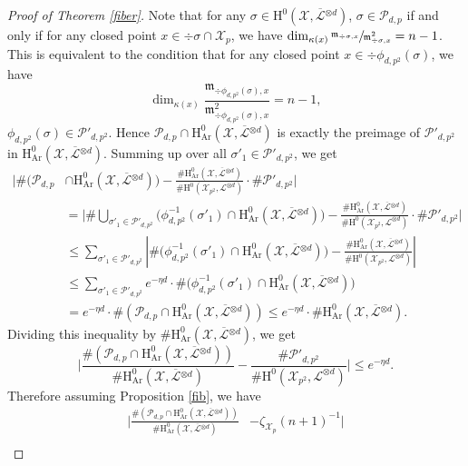 \documentclass[JEP,XML,SOM,Unicode,published]{cedram}
\theoremstyle{plain}
\theoremstyle{definition}
\newcommand{\ho}{\mathrm{H}}
\newcommand{\m}{\mathfrak{m}}
\newcommand{\X}{\mathcal{X}}
\newcommand{\Li}{\overline{\mathcal{L}}{}}
\newcommand{\li}{\mathcal{L}}
\begin{document}
\begin{proof}[Proof of Theorem \ref{fiber}]
Note that for any $\sigma\in \ho^0(\X, \Li^{\otimes d})$, $\sigma \in \mathcal{P}_{d,p}$ if and only if for any closed point $x\in \div \sigma\cap \X_p$, we have $\dim_{\kappa(x)}\sfrac{\m_{\div \sigma,x}}{\m^2_{\div \sigma, x}}=n-1$. This is equivalent to the condition that for any closed point $x\in \div \phi_{d,p^2}(\sigma)$, we have
\[
\dim_{\kappa(x)}\frac{\m_{\div \phi_{d,p^2}(\sigma),x}}{\m^2_{\div \phi_{d,p^2}(\sigma), x}}=n-1,
\]
\ie $\phi_{d,p^2}(\sigma)\in \mathcal{P}'_{d,p^2}$. Hence $\mathcal{P}_{d,p}\cap \ho^0_{\mathrm{Ar}}(\X, \Li^{\otimes d})$ is exactly the preimage of $\mathcal{P}'_{d,p^2}$ in $\ho^0_{\mathrm{Ar}}(\X, \Li^{\otimes d})$. Summing up over all $\sigma'_1\in \mathcal{P}'_{d,p^2}$, we get
\begin{align*}
\biggl| \#\bigl(\mathcal{P}_{d,p}&\cap \ho^0_{\mathrm{Ar}}(\X, \Li^{\otimes d})\bigr) -\frac{\#\ho^0_{\mathrm{Ar}}(\X, \Li^{\otimes d})}{\#\ho^0(\X_{p^2}, \li^{\otimes d})}\cdot\#\mathcal{P}'_{d,p^2} \biggr|\\
&=\biggl| \#\bigcup_{\sigma'_1\in \mathcal{P}'_{d,p^2}}\bigl(\phi_{d,p^2}^{-1}(\sigma'_1)\cap \ho^0_{\mathrm{Ar}}(\X, \Li^{\otimes d}) \bigr) -\frac{\#\ho^0_{\mathrm{Ar}}(\X, \Li^{\otimes d})}{\#\ho^0(\X_{p^2}, \li^{\otimes d})} \cdot \#\mathcal{P}'_{d,p^2} \biggr|
\end{align*}%
\vspace*{-1.45\baselineskip}%
\begin{align*}
&\leq \sum_{\sigma'_1\in \mathcal{P}'_{d,p^2}} \left| \#\bigl(\phi_{d,p^2}^{-1}(\sigma'_1)\cap \ho^0_{\mathrm{Ar}}(\X, \Li^{\otimes d}) \bigr)-\frac{\#\ho^0_{\mathrm{Ar}}(\X, \Li^{\otimes d})}{\#\ho^0(\X_{p^2}, \li^{\otimes d})} \right| \\
&\leq \sum_{\sigma'_1\in \mathcal{P}'_{d,p^2}} e^{-\eta d}\cdot \#\bigl(\phi_{d,p^2}^{-1}(\sigma'_1)\cap \ho^0_{\mathrm{Ar}}(\X, \Li^{\otimes d}) \bigr) \\
&= e^{-\eta d}\cdot \#\left(\mathcal{P}_{d,p}\cap \ho^0_{\mathrm{Ar}}(\X, \Li^{\otimes d})\right)\leq e^{-\eta d}\cdot\#\ho^0_{\mathrm{Ar}}(\X, \Li^{\otimes d}).
\end{align*}
Dividing this inequality by $\#\ho^0_{\mathrm{Ar}}(\X, \Li^{\otimes d})$, we get
\[
\biggl| \frac{\#\left(\mathcal{P}_{d,p}\cap \ho^0_{\mathrm{Ar}}(\X, \Li^{\otimes d})\right)}{\#\ho^0_{\mathrm{Ar}}(\X, \Li^{\otimes d})} -\frac{\#\mathcal{P}'_{d,p^2} }{\#\ho^0(\X_{p^2}, \li^{\otimes d})} \biggr|\leq e^{-\eta d}.
\]
Therefore assuming Proposition \ref{fib}, we have
\begin{align*}
\biggl| \frac{\#\left(\mathcal{P}_{d,p}\cap \ho^0_{\mathrm{Ar}}(\X, \Li^{\otimes d})\right)}{\#\ho^0_{\mathrm{Ar}}(\X, \Li^{\otimes d})} &-\zeta_{\X_p}(n+1)^{-1} \biggr| \\

\end{align*}
\end{proof}
\end{document}
